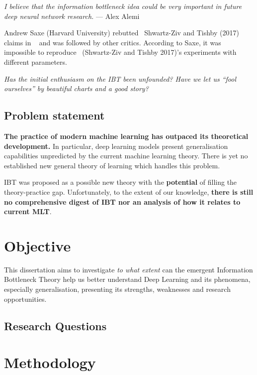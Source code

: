 \documentclass[
  letterpaper,
]{tufte-book}
\renewenvironment{quote}
               {\hspace{4cm}\list{}{\rightmargin\leftmargin}%
                \small%
                \item\relax}
               {\endlist}
\begin{document}
\begin{quote}
\emph{I believe that the information bottleneck idea could be very
important in future deep neural network research.} --- Alex Alemi
\end{quote}

Andrew Saxe (Harvard University) rebutted ~Shwartz-Ziv and Tishby (2017)
claims in ~ and was followed by other critics. According to Saxe, it was
impossible to reproduce ~(Shwartz-Ziv and Tishby 2017)'s experiments
with different parameters.

\emph{Has the initial enthusiasm on the {IBT} been unfounded? Have we
let us ``fool ourselves'' by beautiful charts and a good story?}

\hypertarget{problem-statement}{%
\subsection{Problem statement}\label{problem-statement}}

\textbf{The practice of modern machine learning has outpaced its
theoretical development.} In particular, deep learning models present
generalisation capabilities unpredicted by the current machine learning
theory. There is yet no established new general theory of learning which
handles this problem.

{IBT} was proposed as a possible new theory with the \textbf{potential}
of filling the theory-practice gap. Unfortunately, to the extent of our
knowledge, \textbf{there is still no comprehensive digest of {IBT} nor
an analysis of how it relates to current {MLT}}.

\hypertarget{objective}{%
\section{Objective}\label{objective}}

This dissertation aims to investigate \emph{to what extent} can the
emergent Information Bottleneck Theory help us better understand Deep
Learning and its phenomena, especially generalisation, presenting its
strengths, weaknesses and research opportunities.

\hypertarget{research-questions}{%
\subsection{Research Questions}\label{research-questions}}

\hypertarget{methodology}{%
\section{Methodology}\label{methodology}}
\end{document}
